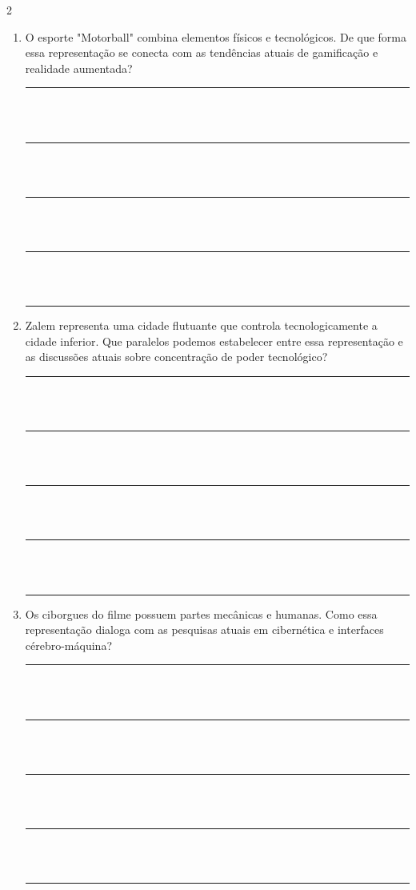 \documentclass[11pt]{article}
\begin{document}
\begin{multicols}{2}
\begin{enumerate}[leftmargin=*, label=\arabic*., series=questoes]
\item O esporte "Motorball" combina elementos físicos e tecnológicos. De que forma essa representação se conecta com as tendências atuais de gamificação e realidade aumentada?

\vspace{0.5cm}
\noindent\rule{\linewidth}{0.4pt}\\
\vspace{0.1cm}\\
\noindent\rule{\linewidth}{0.4pt}\\
\vspace{0.1cm}\\
\noindent\rule{\linewidth}{0.4pt}\\
\vspace{0.1cm}\\
\noindent\rule{\linewidth}{0.4pt}\\
\vspace{0.1cm}\\
\noindent\rule{\linewidth}{0.4pt}

\item Zalem representa uma cidade flutuante que controla tecnologicamente a cidade inferior. Que paralelos podemos estabelecer entre essa representação e as discussões atuais sobre concentração de poder tecnológico?

\vspace{0.5cm}
\noindent\rule{\linewidth}{0.4pt}\\
\vspace{0.1cm}\\
\noindent\rule{\linewidth}{0.4pt}\\
\vspace{0.1cm}\\
\noindent\rule{\linewidth}{0.4pt}\\
\vspace{0.1cm}\\
\noindent\rule{\linewidth}{0.4pt}\\
\vspace{0.1cm}\\
\noindent\rule{\linewidth}{0.4pt}

\item Os ciborgues do filme possuem partes mecânicas e humanas. Como essa representação dialoga com as pesquisas atuais em cibernética e interfaces cérebro-máquina?

\vspace{0.5cm}
\noindent\rule{\linewidth}{0.4pt}\\
\vspace{0.1cm}\\
\noindent\rule{\linewidth}{0.4pt}\\
\vspace{0.1cm}\\
\noindent\rule{\linewidth}{0.4pt}\\
\vspace{0.1cm}\\
\noindent\rule{\linewidth}{0.4pt}\\
\vspace{0.1cm}\\
\noindent\rule{\linewidth}{0.4pt}


\end{enumerate}
\end{multicols}
\end{document}
